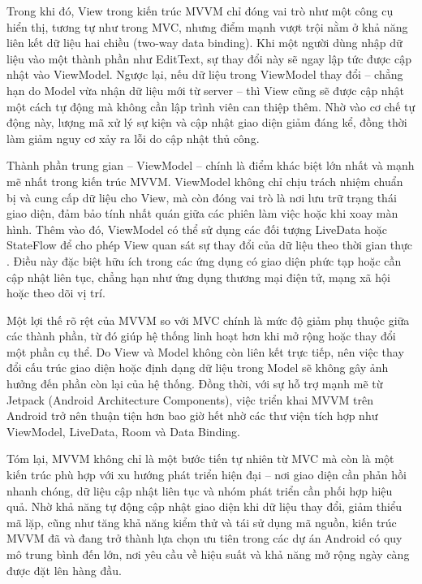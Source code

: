     
      Trong khi đó, View trong kiến trúc MVVM chỉ đóng vai trò như một công cụ hiển thị, tương tự như trong MVC, nhưng điểm mạnh vượt trội nằm ở khả năng liên kết dữ liệu hai chiều (two-way data binding). Khi một người dùng nhập dữ liệu vào một thành phần như EditText, sự thay đổi này sẽ ngay lập tức được cập nhật vào ViewModel. Ngược lại, nếu dữ liệu trong ViewModel thay đổi – chẳng hạn do Model vừa nhận dữ liệu mới từ server – thì View cũng sẽ được cập nhật một cách tự động mà không cần lập trình viên can thiệp thêm. Nhờ vào cơ chế tự động này, lượng mã xử lý sự kiện và cập nhật giao diện giảm đáng kể, đồng thời làm giảm nguy cơ xảy ra lỗi do cập nhật thủ công.
    \vspace{0.5em}

    
      Thành phần trung gian – ViewModel – chính là điểm khác biệt lớn nhất và mạnh mẽ nhất trong kiến trúc MVVM. ViewModel không chỉ chịu trách nhiệm chuẩn bị và cung cấp dữ liệu cho View, mà còn đóng vai trò là nơi lưu trữ trạng thái giao diện, đảm bảo tính nhất quán giữa các phiên làm việc hoặc khi xoay màn hình. Thêm vào đó, ViewModel có thể sử dụng các đối tượng LiveData hoặc StateFlow để cho phép View quan sát sự thay đổi của dữ liệu theo thời gian thực \cite{stateflow}. Điều này đặc biệt hữu ích trong các ứng dụng có giao diện phức tạp hoặc cần cập nhật liên tục, chẳng hạn như ứng dụng thương mại điện tử, mạng xã hội hoặc theo dõi vị trí.
    \vspace{0.5em}

    
      Một lợi thế rõ rệt của MVVM so với MVC chính là mức độ giảm phụ thuộc giữa các thành phần, từ đó giúp hệ thống linh hoạt hơn khi mở rộng hoặc thay đổi một phần cụ thể. Do View và Model không còn liên kết trực tiếp, nên việc thay đổi cấu trúc giao diện hoặc định dạng dữ liệu trong Model sẽ không gây ảnh hưởng đến phần còn lại của hệ thống. Đồng thời, với sự hỗ trợ mạnh mẽ từ Jetpack (Android Architecture Components), việc triển khai MVVM trên Android trở nên thuận tiện hơn bao giờ hết nhờ các thư viện tích hợp như ViewModel, LiveData, Room và Data Binding.
    \vspace{0.5em}

    
      Tóm lại, MVVM không chỉ là một bước tiến tự nhiên từ MVC mà còn là một kiến trúc phù hợp với xu hướng phát triển hiện đại – nơi giao diện cần phản hồi nhanh chóng, dữ liệu cập nhật liên tục và nhóm phát triển cần phối hợp hiệu quả. Nhờ khả năng tự động cập nhật giao diện khi dữ liệu thay đổi, giảm thiểu mã lặp, cũng như tăng khả năng kiểm thử và tái sử dụng mã nguồn, kiến trúc MVVM đã và đang trở thành lựa chọn ưu tiên trong các dự án Android có quy mô trung bình đến lớn, nơi yêu cầu về hiệu suất và khả năng mở rộng ngày càng được đặt lên hàng đầu.


